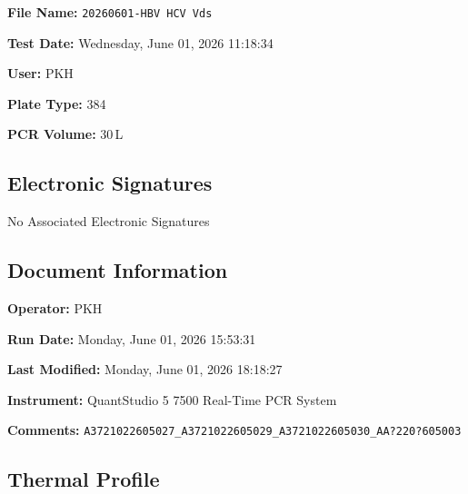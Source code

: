 \documentclass[UTF8,10pt,a4paper,fontset=fandol]{ctexart}
\newcommand{\fieldvalue}[1]{#1}
\begin{document}
\newpage

\noindent
\textbf{File Name:}
\fieldvalue{\texttt{20260601-HBV HCV Vds}}

\noindent
\textbf{Test Date:}
\fieldvalue{Wednesday, June 01, 2026 11:18:34}

\noindent
\textbf{User:}
\fieldvalue{PKH}

\noindent
\textbf{Plate Type:}
\fieldvalue{384}

\noindent
\textbf{PCR Volume:}
\fieldvalue{30\,\textmu L}

\subsection*{Electronic Signatures}

\fieldvalue{No Associated Electronic Signatures}

\subsection*{Document Information}

\noindent
\textbf{Operator:}
\fieldvalue{PKH}

\noindent
\textbf{Run Date:}
\fieldvalue{Monday, June 01, 2026 15:53:31}

\noindent
\textbf{Last Modified:}
\fieldvalue{Monday, June 01, 2026 18:18:27}

\noindent
\textbf{Instrument:}
\fieldvalue{QuantStudio 5 7500 Real-Time PCR System}

\noindent
\textbf{Comments:}
\fieldvalue{\texttt{A3721022605027\_A3721022605029\_A3721022605030\_AA?220?605003}}

\subsection*{Thermal Profile}
\end{document}
